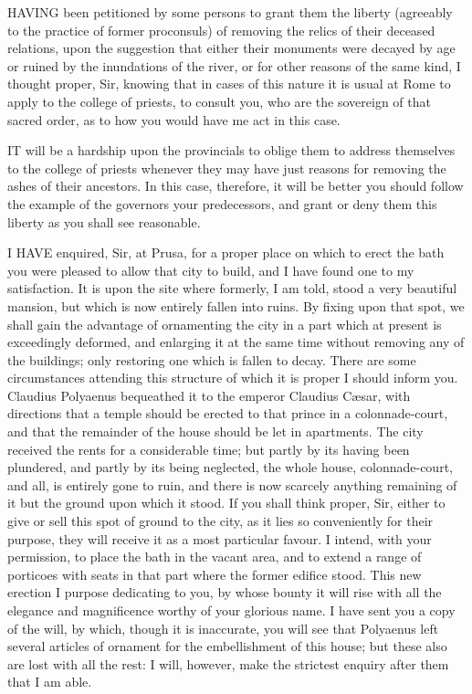 
HAVING been petitioned by some persons to grant them the liberty
(agreeably to the practice of former proconsuls) of removing the relics of
their deceased relations, upon the suggestion that either their monuments
were decayed by age or ruined by the inundations of the river, or for
other reasons of the same kind, I thought proper, Sir, knowing that in
cases of this nature it is usual at Rome to apply to the college of
priests, to consult you, who are the sovereign of that sacred order, as to
how you would have me act in this case.


IT will be a hardship upon the provincials to oblige them to address
themselves to the college of priests whenever they may have just reasons
for removing the ashes of their ancestors. In this case, therefore, it
will be better you should follow the example of the governors your
predecessors, and grant or deny them this liberty as you shall see
reasonable.


I HAVE enquired, Sir, at Prusa, for a proper place on which to erect the
bath you were pleased to allow that city to build, and I have found one to
my satisfaction. It is upon the site where formerly, I am told, stood a
very beautiful mansion, but which is now entirely fallen into ruins. By
fixing upon that spot, we shall gain the advantage of ornamenting the city
in a part which at present is exceedingly deformed, and enlarging it at
the same time without removing any of the buildings; only restoring one
which is fallen to decay. There are some circumstances attending this
structure of which it is proper I should inform you. Claudius Polyaenus
bequeathed it to the emperor Claudius Cæsar, with directions that a temple
should be erected to that prince in a colonnade-court, and that the
remainder of the house should be let in apartments. The city received the
rents for a considerable time; but partly by its having been plundered,
and partly by its being neglected, the whole house, colonnade-court, and
all, is entirely gone to ruin, and there is now scarcely anything
remaining of it but the ground upon which it stood. If you shall think
proper, Sir, either to give or sell this spot of ground to the city, as it
lies so conveniently for their purpose, they will receive it as a most
particular favour. I intend, with your permission, to place the bath in
the vacant area, and to extend a range of porticoes with seats in that
part where the former edifice stood. This new erection I purpose
dedicating to you, by whose bounty it will rise with all the elegance and
magnificence worthy of your glorious name. I have sent you a copy of the
will, by which, though it is inaccurate, you will see that Polyaenus left
several articles of ornament for the embellishment of this house; but
these also are lost with all the rest: I will, however, make the strictest
enquiry after them that I am able.

